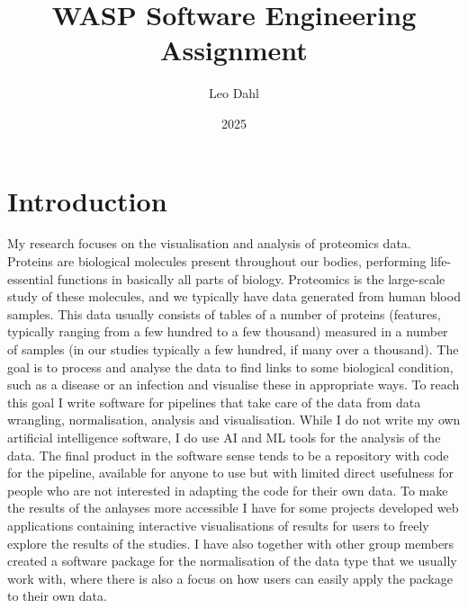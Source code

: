 \documentclass[11pt]{article}
\title{WASP Software Engineering Assignment}
\author{Leo Dahl}
\date{2025}
\begin{document}
\maketitle

\section{Introduction}

My research focuses on the visualisation and analysis of proteomics data. Proteins are biological molecules present throughout our bodies, performing life-essential functions in basically all parts of biology. Proteomics is the large-scale study of these molecules, and we typically have data generated from human blood samples. This data usually consists of tables of a number of proteins (features, typically ranging from a few hundred to a few thousand) measured in a number of samples (in our studies typically a few hundred, if many over a thousand). The goal is to process and analyse the data to find links to some biological condition, such as a disease or an infection and visualise these in appropriate ways. To reach this goal I write software for pipelines that take care of the data from data wrangling, normalisation, analysis and visualisation.  While I do not write my own artificial intelligence software, I do use AI and ML tools for the analysis of the data. The final product in the software sense tends to be a repository with code for the pipeline, available for anyone to use but with limited direct usefulness for people who are not interested in adapting the code for their own data. To make the results of the anlayses more accessible I have for some projects developed web applications containing interactive visualisations of results for users to freely explore the results of the studies. I have also together with other group members created a software package for the normalisation of the data type that we usually work with, where there is also a focus on how users can easily apply the package to their own data.
\end{document}
